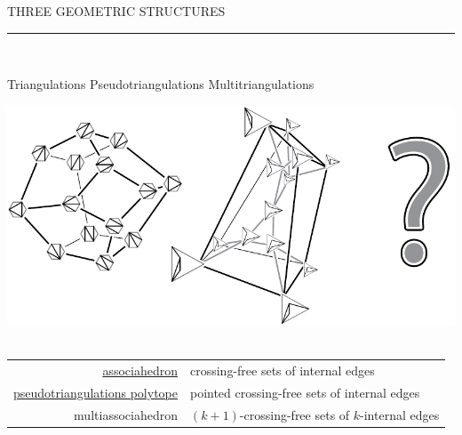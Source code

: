 \documentclass[12pt,titlepage,landscape,a4paper]{article}
\newcommand{\textemoyen}{\fontsize{23}{27}\selectfont}
\newenvironment{slide}[1]
{
\newpage
\begin{center}
{\blue \textemoyen \uppercase{#1}}\\
\end{center}
\vspace{-1cm}
\rule{\textwidth}{0.5 pt}\\
\vspace{-.8cm}
}
{\vspace*{-3cm}}
\newcommand{\violet}{\color{violet}} %
\newcommand{\blue}{\color{blue}} %
\newcommand{\red}{\color{red}} %
\newcommand{\papier}[1]{{\violet\fontsize{15}{20}\selectfont #1}} %
\renewcommand{\emph}[1]{\uline{#1}}
\begin{document}
\begin{slide}{Three geometric structures}

\hspace{1.6cm} Triangulations \hspace{3.4cm} Pseudotriangulations \hspace{2.5cm} Multitriangulations
\begin{center}\includegraphics[width=.95\textwidth]{geometricStructures4}\hspace*{1.5cm}~\end{center}
\begin{center}
\begin{tabular}{r@{\quad $\longleftrightarrow$ \quad}l}
\emph{associahedron} & crossing-free sets of internal edges \\
\emph{pseudotriangulations polytope} & pointed crossing-free sets of internal edges \\
{\red multiassociahedron} & $(k+1)$-crossing-free sets of $k$-internal edges
\end{tabular}
\end{center}

\vspace{-1cm}
\end{slide}

%
%
\end{document}
